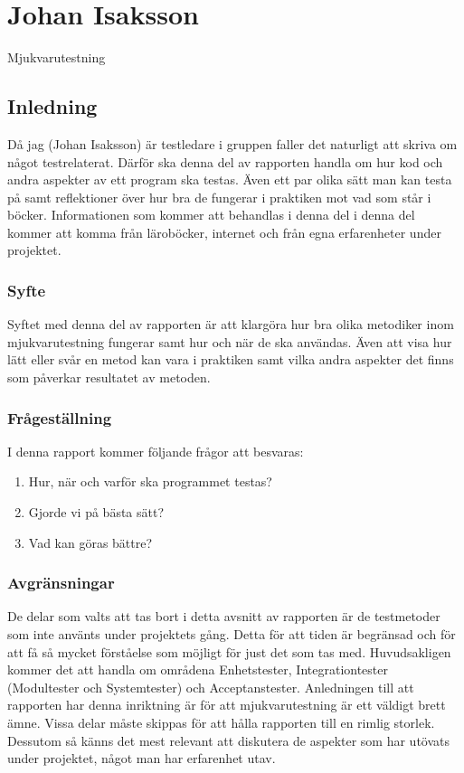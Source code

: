\section{Johan Isaksson}
Mjukvarutestning
	\subsection{Inledning}
	Då jag (Johan Isaksson) är testledare i gruppen faller det naturligt att skriva om något testrelaterat. Därför ska denna del av rapporten handla om hur kod och andra aspekter av ett program ska testas. Även ett par olika sätt man kan testa på samt reflektioner över hur bra de fungerar i praktiken mot vad som står i böcker. Informationen som kommer att behandlas i denna del i denna del kommer att komma från läroböcker, internet och från egna erfarenheter under projektet. 
	
	
	\subsubsection{Syfte}
	Syftet med denna del av rapporten är att klargöra hur bra olika metodiker inom mjukvarutestning fungerar samt hur och när de ska användas. Även att visa hur lätt eller svår en metod kan vara i praktiken samt vilka andra aspekter det finns som påverkar resultatet av metoden.
	
	
	\subsubsection{Frågeställning}
	I denna rapport kommer följande frågor att besvaras:
	\begin{enumerate}
	\item{Hur, när och varför ska programmet testas?}
	\item{Gjorde vi på bästa sätt?}
	\item{Vad kan göras bättre?}
	\end{enumerate}
	
	\subsubsection{Avgränsningar}
	De delar som valts att tas bort i detta avsnitt av rapporten är de testmetoder som inte använts under projektets gång. Detta för att tiden är begränsad och för att få så mycket förståelse som möjligt för just det som tas med. Huvudsakligen kommer det att handla om områdena Enhetstester, Integrationtester (Modultester och Systemtester) och Acceptanstester. \newline
	Anledningen till att rapporten har denna inriktning är för att mjukvarutestning är ett väldigt brett ämne. Vissa delar måste skippas för att hålla rapporten till en rimlig storlek. Dessutom så känns det mest relevant att diskutera de aspekter som har utövats under projektet, något man har erfarenhet utav.
	
